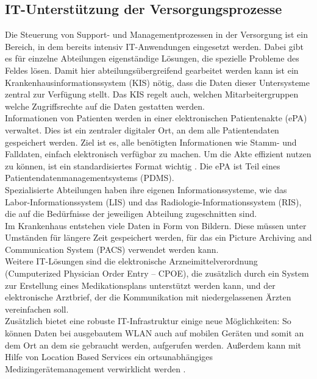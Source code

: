\subsection{IT-Unterstützung der Versorgungsprozesse}
Die Steuerung von Support- und Managementprozessen in der Versorgung ist ein Bereich, in dem bereits intensiv IT-Anwendungen eingesetzt werden. Dabei gibt es für einzelne Abteilungen eigenständige Lösungen, die spezielle Probleme des Feldes lösen. Damit hier abteilungsübergreifend gearbeitet werden kann ist ein Krankenhausinformationssystem (KIS) nötig, dass die Daten dieser Untersysteme zentral zur Verfügung stellt. Das KIS regelt auch, welchen Mitarbeitergruppen welche Zugriffsrechte auf die Daten gestatten werden.\\

Informationen von Patienten werden in einer elektronischen Patientenakte (ePA) verwaltet. Dies ist ein zentraler digitaler Ort, an dem alle Patientendaten gespeichert werden. Ziel ist es, alle benötigten Informationen wie Stamm- und Falldaten, einfach elektronisch verfügbar zu machen. Um die Akte effizient nutzen zu können, ist ein standardisiertes Format wichtig \parencite{oswald2019}. Die ePA ist Teil eines Patientendatenmanagementsystems (PDMS).\\

Spezialisierte Abteilungen haben ihre eigenen Informationssysteme, wie das Labor-Informationssystem (LIS) und das Radiologie-Informationssystem (RIS), die auf die Bedürfnisse der jeweiligen Abteilung zugeschnitten sind.\\

Im Krankenhaus entstehen viele Daten in Form von Bildern. Diese müssen unter Umständen für längere Zeit gespeichert werden, für das ein Picture Archiving and Communication System (PACS) verwendet werden kann.\\

Weitere IT-Lösungen sind die elektronische Arzneimittelverordnung (Cumputerized Physician Order Entry -- CPOE), die zusätzlich durch ein System zur Erstellung eines Medikationsplans unterstützt werden kann, und der elektronische Arztbrief, der die Kommunikation mit niedergelassenen Ärzten vereinfachen soll. \parencite{braeutigam2017}\\

Zusätzlich bietet eine robuste IT-Infrastruktur einige neue Möglichkeiten: So können Daten bei ausgebautem WLAN auch auf mobilen Geräten und somit an dem Ort an dem sie gebraucht werden, aufgerufen werden. Außerdem kann mit Hilfe von Location Based Services ein ortsunabhängiges Medizingerätemanagement verwirklicht werden \parencite{mci/Leimeister2006}.


